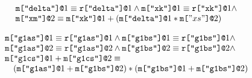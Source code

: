 $$
\begin{array}{l}
\mx{\ttt{"delta"}}{1} \eop \rx{\ttt{"delta"}}{1} \wedge
\mx{\ttt{"xk"}}{1} \eop \rx{\ttt{"xk"}}{1} \wedge\\
\mx{\ttt{"xm"}}{2} \eop \mx{\ttt{"xk"}}{1} \fplus (\mx{\ttt{"delta"}}{1} * \mx{"xs"}{2})
\end{array}
$$

$$
\begin{array}{l}
\mx{\ttt{"g1as"}}{1} \eop \rx{\ttt{"g1as"}}{1} \wedge 
\mx{\ttt{"g1bs"}}{1} \eop \rx{\ttt{"g1bs"}}{1} \wedge\\
\mx{\ttt{"g1as"}}{2} \eop \rx{\ttt{"g1as"}}{2} \wedge 
\mx{\ttt{"g1bs"}}{2} \eop \rx{\ttt{"g1bs"}}{2} \wedge\\
\mx{\ttt{"g1cs"}}{1} \fplus \mx{\ttt{"g1cs"}}{2} \eop \\
\quad (\mx{\ttt{"g1as"}}{1} \fplus \mx{\ttt{"g1bs"}}{2}) \ftimes
      (\mx{\ttt{"g1bs"}}{1} \fplus \mx{\ttt{"g1bs"}}{2}) 
\end{array}
$$


